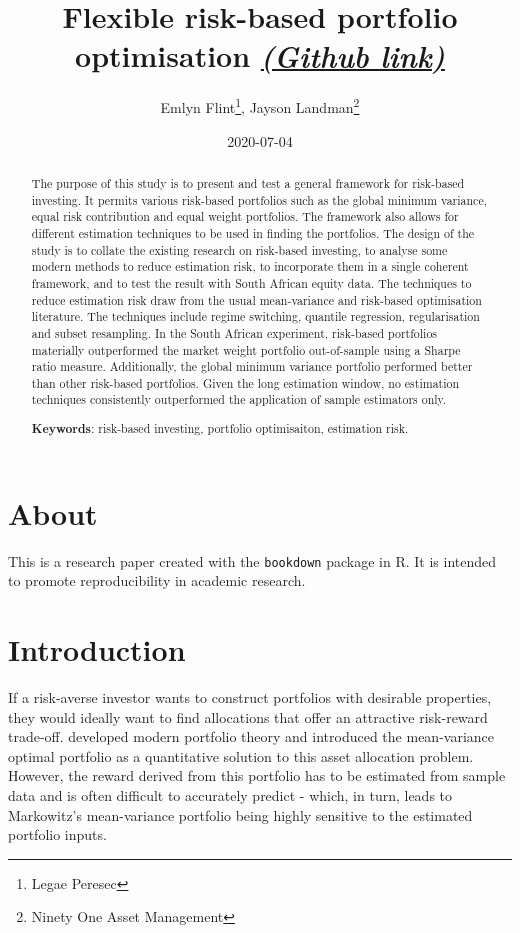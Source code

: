 \documentclass[
]{article}
\title{Flexible risk-based portfolio optimisation
\href{https://github.com/jhlandman/flex_rb_opt}{\emph{(Github link)}}}
\author{Emlyn Flint\footnote{Legae Peresec}, Jayson Landman\footnote{Ninety One Asset Management}}
\date{2020-07-04}
\begin{document}
\maketitle
\begin{abstract}
The purpose of this study is to present and test a general framework for risk-based investing. It permits various risk-based portfolios such as the global minimum variance, equal risk contribution and equal weight portfolios. The framework also allows for different estimation techniques to be used in finding the portfolios. The design of the study is to collate the existing research on risk-based investing, to analyse some modern methods to reduce estimation risk, to incorporate them in a single coherent framework, and to test the result with South African equity data. The techniques to reduce estimation risk draw from the usual mean-variance and risk-based optimisation literature. The techniques include regime switching, quantile regression, regularisation and subset resampling. In the South African experiment, risk-based portfolios materially outperformed the market weight portfolio out-of-sample using a Sharpe ratio measure. Additionally, the global minimum variance portfolio performed better than other risk-based portfolios. Given the long estimation window, no estimation techniques consistently outperformed the application of sample estimators only.

\textbf{Keywords}: risk-based investing, portfolio optimisaiton, estimation risk.
\end{abstract}

{
\setcounter{tocdepth}{2}
\tableofcontents
}
\hypertarget{about}{%
\section{About}\label{about}}

This is a research paper created with the \texttt{bookdown} package in R. It is intended to promote
reproducibility in academic research.

\hypertarget{introduction}{%
\section{Introduction}\label{introduction}}

If a risk-averse investor wants to construct portfolios with desirable properties, they would
ideally want to find allocations that offer an attractive risk-reward trade-off. \citet{M52} developed
modern portfolio theory and introduced the mean-variance optimal portfolio as a quantitative
solution to this asset allocation problem. However, the reward derived from this portfolio has to be
estimated from sample data and is often difficult to accurately predict - which, in turn, leads to
Markowitz's mean-variance portfolio being highly sensitive to the estimated portfolio inputs.
\end{document}
